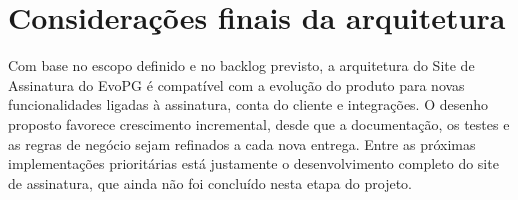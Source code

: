 \documentclass[
  12pt,
  openany,
  oneside,
  a4paper,
  brazil
]{abntex2}
\newcommand{\ProjetoNome}{Site de Assinatura do EvoPG}
\begin{document}
\section{Considera\c{c}\~oes finais da arquitetura}
Com base no escopo definido e no backlog previsto, a arquitetura do \ProjetoNome{} \'e compat\'ivel com a evolu\c{c}\~ao do produto para novas funcionalidades ligadas \`a assinatura, conta do cliente e integra\c{c}\~oes. O desenho proposto favorece crescimento incremental, desde que a documenta\c{c}\~ao, os testes e as regras de neg\'ocio sejam refinados a cada nova entrega. Entre as pr\'oximas implementa\c{c}\~oes priorit\'arias est\'a justamente o desenvolvimento completo do site de assinatura, que ainda n\~ao foi conclu\'ido nesta etapa do projeto.
\end{document}
